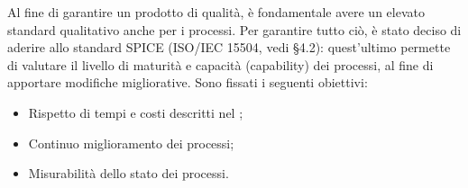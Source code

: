Al fine di garantire un prodotto di qualità, è fondamentale avere un elevato 
standard qualitativo anche per i processi. Per garantire tutto ciò, 
è stato deciso di aderire allo standard {SPICE} (ISO/IEC 15504, vedi \NdP \space §4.2): quest'ultimo permette 
di valutare il livello di {maturità} e capacità ({capability}) 
dei processi, al fine di apportare modifiche migliorative.\newline
Sono fissati i seguenti obiettivi:
\begin{itemize}
	\item Rispetto di tempi e costi descritti nel \PdP ;
	\item Continuo miglioramento dei processi;
	\item Misurabilità dello stato dei processi.
\end{itemize}
